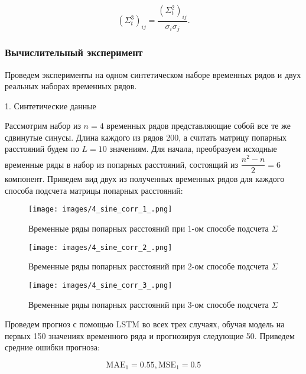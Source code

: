 \documentclass{article}
\begin{document}
\begin{equation}
(\Sigma_t^{3})_{ij} = \dfrac{(\Sigma_t^{2})_{ij}}{\sigma_i \sigma_j}.
\end{equation}

\subsubsection{Вычислительный эксперимент}

Проведем эксперименты на одном синтетическом наборе временных рядов и двух реальных наборах временных рядов. 

1. Синтетические данные

Рассмотрим набор из $n = 4$ временных рядов представляющие собой все те же сдвинутые синусы. Длина каждого из рядов 200, а считать матрицу попарных расстояний будем по $L = 10$ значениям. Для начала, преобразуем исходные временные ряды в набор из попарных расстояний, состоящий из $\dfrac{n^2 - n}{2} = 6$ компонент. Приведем вид двух из полученных временных рядов для каждого способа подсчета матрицы попарных расстояний:

\begin{figure}[h]
  \begin{minipage}{0.5\textwidth}
    \centering
    \texttt{[image: images/4\_sine\_corr\_1\_.png]}
    \caption{Временные ряды попарных расстояний при 1-ом способе подсчета $\Sigma$}
  \end{minipage}\hfill
  \begin{minipage}{0.5\textwidth}
    \centering
    \texttt{[image: images/4\_sine\_corr\_2\_.png]}
    \caption{Временные ряды попарных расстояний при 2-ом способе подсчета $\Sigma$}
  \end{minipage}
\end{figure}

\begin{figure}[h]
  \centering
  \begin{minipage}{0.5\textwidth}
    \centering
    \texttt{[image: images/4\_sine\_corr\_3\_.png]}
    \caption{Временные ряды попарных расстояний при 3-ом способе подсчета $\Sigma$}
  \end{minipage}\hfill
\end{figure}

Проведем прогноз с помощью LSTM во всех трех случаях, обучая модель на первых 150 значениях временного ряда и прогнозируя следующие 50. Приведем средние ошибки прогноза:

\begin{equation}
    \text{MAE}_1 = 0.55, \text{MSE}_1 = 0.5
\end{equation}
\end{document}
